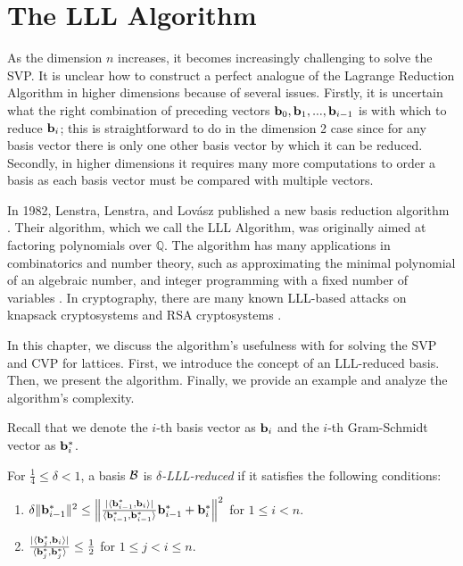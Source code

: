 \documentclass[a4paper,12pt]{article}
\begin{document}
\section{The LLL Algorithm}\label{LLL}

As the dimension $n$ increases, it becomes increasingly challenging to solve the SVP. It is unclear how to construct a perfect analogue of the Lagrange Reduction Algorithm in higher dimensions because of several issues. Firstly, it is uncertain what the right combination of preceding vectors $\mathbf{b}_0, \mathbf{b}_1, ..., \mathbf{b}_{i-1}$ is with which to reduce $\mathbf{b}_i$; this is straightforward to do in the dimension 2 case since for any basis vector there is only one other basis vector by which it can be reduced. Secondly, in higher dimensions it requires many more computations to order a basis as each basis vector must be compared with multiple vectors.

In 1982, Lenstra, Lenstra, and Lov\'asz published a new basis reduction algorithm \cite{LLL}. Their algorithm, which we call the LLL Algorithm, was originally aimed at factoring polynomials over $\mathbb{Q}$. The algorithm has many applications in combinatorics and number theory, such as approximating the minimal polynomial of an algebraic number, and integer programming with a fixed number of variables \cite{Lenstra}. In cryptography, there are many known LLL-based attacks on knapsack cryptosystems and RSA cryptosystems \cite{May}. 

In this chapter, we discuss the algorithm's usefulness with for solving the SVP and CVP for lattices. First, we introduce the concept of an LLL-reduced basis. Then, we present the algorithm. Finally, we provide an example and analyze the algorithm's complexity.

Recall that we denote the $i$-th basis vector as $\mathbf{b}_i$ and the $i$-th Gram-Schmidt vector as $\mathbf{b}_i^*$.

\begin{defn}
For $\frac{1}{4} \leq \delta < 1$, a basis $\mathcal{B}$ is \textit{$\delta$-LLL-reduced} if it satisfies the following conditions: 
\begin{enumerate}
    \item $\delta\| \mathbf{b}_{i-1}^{*} \|^2 \leq \Big\| \frac{| \langle \mathbf{b}_{i-1}^{*}, \mathbf{b}_{i} \rangle |}{\langle \mathbf{b}_{i-1}^{*}, \mathbf{b}_{i-1}^{*} \rangle}\mathbf{b}_{i-1}^{*} + \mathbf{b}_{i}^{*} \Big\|^2$ for $1 \leq i < n$.
    \item $\frac{| \langle \mathbf{b}_j^{*}, \mathbf{b}_i \rangle |}{\langle \mathbf{b}_j^{*}, \mathbf{b}_j^{*} \rangle} \leq \frac{1}{2}$ for $1 \leq j < i \leq n$.
\end{enumerate}
\end{defn}
\end{document}
